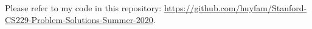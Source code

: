 \begin{answer}
Please refer to my code in this repository: \url{https://github.com/huyfam/Stanford-CS229-Problem-Solutions-Summer-2020}. \\
\end{answer}
